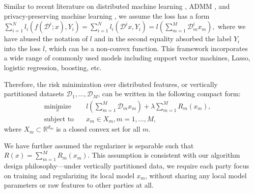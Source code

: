 Similar to recent literature on distributed machine learning \cite{ying2018supervised,zhou2016convergence}, ADMM \cite{zhang2016dual,zhang2018improving}, and privacy-preserving machine learning \cite{chaudhuri2011differentially,hamm2016learning}, we assume the loss has a form
$
\sum_{i=1}^{N}l_i(f(\mathcal{D}^i; x), Y_i) = \sum_{i=1}^{N}l_i(\mathcal{D}^i x, Y_i)
=l\left(\sum_{m=1}^{M} \mathcal{D}_m^i x_m\right),
$
where we have abused the notation of $l$ and in the second equality absorbed the label $Y_i$ into the loss $l$, which can be a non-convex function.
This framework incorporates a wide range of commonly used models including support vector machines, Lasso, logistic regression, boosting, etc.





Therefore, the risk minimization over distributed features, or vertically partitioned datasets $\mathcal D_1,\ldots,\mathcal D_M$, can be written in the following compact form:
\begin{align}
\underset{x}{\text{minimize}}&\quad l\left(\sum_{m=1}^{M} \mathcal{D}_mx_m\right) + \lambda\sum_{m=1}^{M} R_m(x_m), \label{eq:analysis_problem}\\
\text{subject to}&\quad x_m\in X_m, m=1,\ldots,M,
\end{align}
where  $X_m\subset\mathbb{R}^{d_m}$ is a closed convex set for all $m$.

We have further assumed the regularizer is separable such that
$R(x) = \sum_{m=1}^{M} R_m(x_m).$ This assumption is consistent with our algorithm design philosophy---under vertically partitioned data, we require each party focus on training and regularizing its local model $x_m$, without sharing any local model parameters or raw features to other parties at all. 